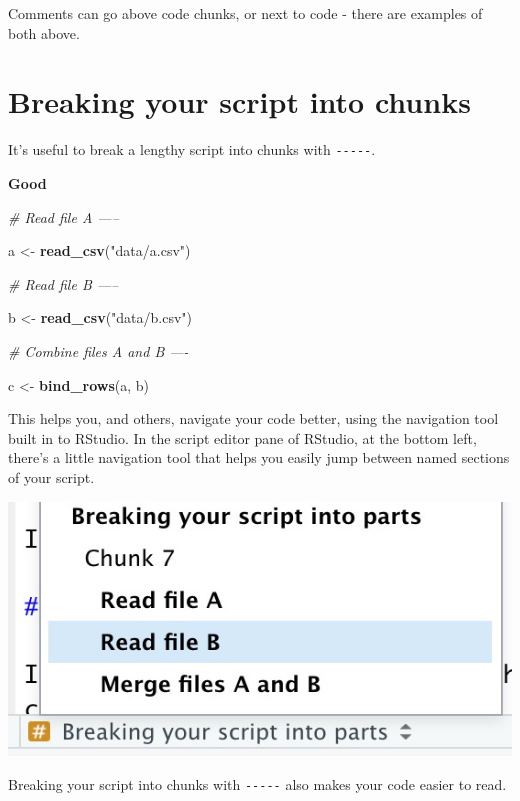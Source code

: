 \documentclass[]{book}
\newenvironment{Shaded}{\begin{snugshade}}{\end{snugshade}}
\newcommand{\CommentTok}[1]{\textcolor[rgb]{0.56,0.35,0.01}{\textit{#1}}}
\newcommand{\KeywordTok}[1]{\textcolor[rgb]{0.13,0.29,0.53}{\textbf{#1}}}
\newcommand{\NormalTok}[1]{#1}
\newcommand{\StringTok}[1]{\textcolor[rgb]{0.31,0.60,0.02}{#1}}
\begin{document}
Comments can go above code chunks, or next to code - there are examples of both above.

\hypertarget{breaking-your-script-into-chunks}{%
\section{Breaking your script into chunks}\label{breaking-your-script-into-chunks}}

It's useful to break a lengthy script into chunks with \texttt{-\/-\/-\/-\/-}.

\textbf{Good}

\begin{Shaded}
\begin{Highlighting}[]
\CommentTok{# Read file A -----}

\NormalTok{a <-}\StringTok{ }\KeywordTok{read_csv}\NormalTok{(}\StringTok{"data/a.csv"}\NormalTok{)}

\CommentTok{# Read file B -----}

\NormalTok{b <-}\StringTok{ }\KeywordTok{read_csv}\NormalTok{(}\StringTok{"data/b.csv"}\NormalTok{)}

\CommentTok{# Combine files A and B ----}

\NormalTok{c <-}\StringTok{ }\KeywordTok{bind_rows}\NormalTok{(a, b)}
\end{Highlighting}
\end{Shaded}

This helps you, and others, navigate your code better, using the navigation tool built in to RStudio. In the script editor pane of RStudio, at the bottom left, there's a little navigation tool that helps you easily jump between named sections of your script.

\includegraphics[width=7.64in]{atlas/rstudio_navigation}

Breaking your script into chunks with \texttt{-\/-\/-\/-\/-} also makes your code easier to read.
\end{document}
